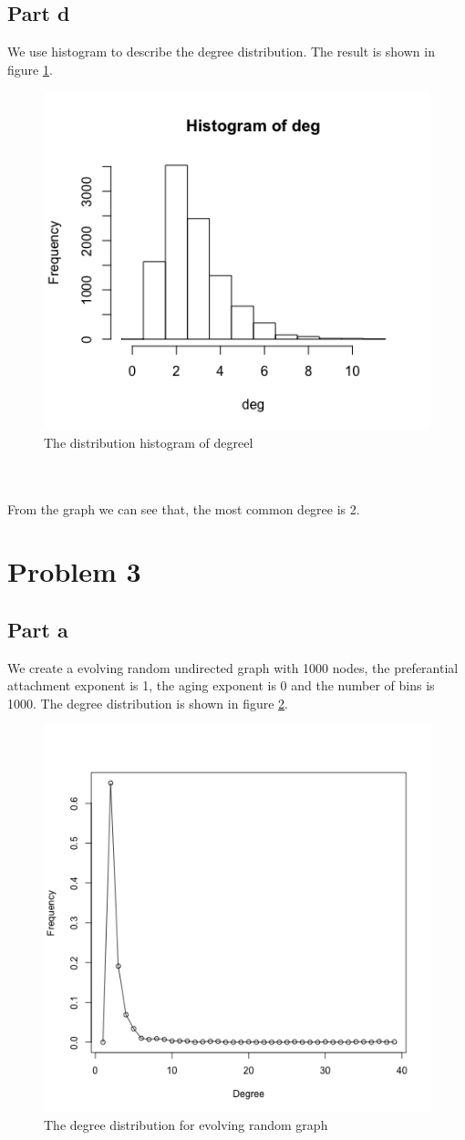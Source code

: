 \documentclass{article}
\begin{document}
\subsection{Part d}
We use histogram to describe the degree distribution. The result is shown in figure \ref{fig:p2_2}. \\
\begin{figure}[htbp]
\centering
\includegraphics[width=.6\textwidth]{p2_2.png}
\caption{The distribution histogram of degreel}
\label{fig:p2_2}
\end{figure}
\\
\\
From the graph we can see that, the most common degree is 2.
\section{Problem 3}
\subsection{Part a}
We create a evolving random undirected graph with 1000 nodes, the preferantial attachment exponent is 1, the aging exponent is 0 and the number of bins is 1000. The degree distribution is shown in figure \ref{fig:p3_1}.
\begin{figure}[htbp]
\centering
\includegraphics[width=.6\textwidth]{p3_1.png}
\caption{The degree distribution for evolving random graph}
\label{fig:p3_1}
\end{figure}
\end{document}
